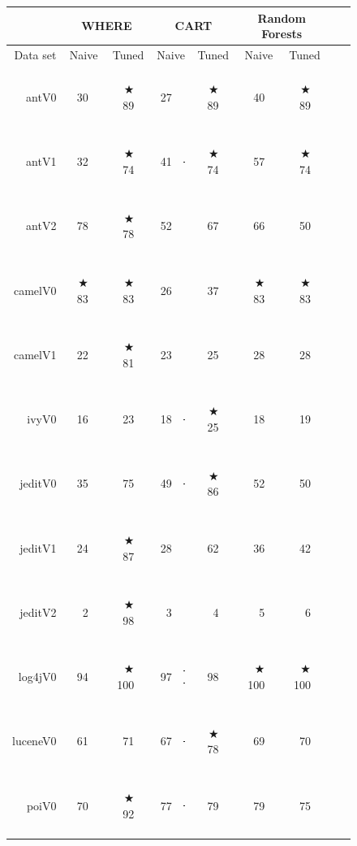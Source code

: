 \documentclass{sig-alternative}
\newcommand{\crule}[3][darkgray]{\textcolor{#1}{\rule{#2}{#3}}}
\newcommand{\rone}{\crule{1mm}{1.95mm}}
\newcommand{\rtwo}{\crule{1mm}{1.95mm}\hspace{0.3pt}\crule{1mm}{1.95mm}}
\newcommand{\rthree}{\crule{1mm}{1.95mm}\hspace{0.3pt}\crule{1mm}{1.95mm}\hspace{0.3pt}\crule{1mm}{1.95mm}}
\newcommand{\rfour}{\crule{1mm}{1.95mm}\hspace{0.3pt}\crule{1mm}{1.95mm}\hspace{0.3pt}\crule{1mm}{1.95mm}\hspace{0.3pt}\crule{1mm}{1.95mm}}
\def\baselinestretch{1}
\begin{document}
\begin{figure}
\renewcommand{\baselinestretch}{0.8} 

\scriptsize  
\begin{tabular}{r|r@{~}l@{~}|r@{~}l|r@{~}l|r@{~}l|r@{~}l@{~}|r@{~}l@{~}r@{~}l}
      &   \multicolumn{4}{c|}{WHERE}         &   \multicolumn{4}{c|}{CART}         &   \multicolumn{4}{c}{Random Forests}         \\\hline
  Data set   &   \multicolumn{2}{c}{Naive}         &   \multicolumn{2}{c|}{Tuned}         &   \multicolumn{2}{c}{Naive}         &   \multicolumn{2}{c|}{Tuned}    &   \multicolumn{2}{c}{Naive}  &   \multicolumn{2}{c}{Tuned}\\\hline
 
antV0 & 30 &         & $\bigstar$ 89 & {\rfour} & 27 &         &$\bigstar$ 89 & {\rfour} & 40 & {\rone} &$\bigstar$ 89 & {\rfour}\\
antV1 & 32 &         &$\bigstar$ 74 & {\rfour} & 41 & {\rone} &$\bigstar$ 74 & {\rfour} & 57 & {\rtwo} &$\bigstar$ 74 & {\rfour}\\
antV2 & 78 & {\rfour} &$\bigstar$ 78 & {\rfour} & 52 &         & 67 & {\rthree} & 66 & {\rtwo} & 50 &        \\
camelV0 &$\bigstar$ 83 & {\rfour} &$\bigstar$ 83 & {\rfour} & 26 &         & 37 &         &$\bigstar$ 83 & {\rfour} &$\bigstar$ 83 & {\rfour}\\
camelV1 & 22 &         &$\bigstar$ 81 & {\rfour} & 23 &         & 25 &         & 28 &         & 28 &        \\
ivyV0 & 16 &         & 23 & {\rthree} & 18 & {\rone} &$\bigstar$ 25 & {\rfour} & 18 & {\rone} & 19 & {\rone}\\
jeditV0 & 35 &         & 75 & {\rthree} & 49 & {\rone} &$\bigstar$ 86 & {\rfour} & 52 & {\rone} & 50 & {\rone}\\
jeditV1 & 24 &         &$\bigstar$ 87 & {\rfour} & 28 &         & 62 & {\rthree} & 36 &         & 42 & {\rone}\\
jeditV2 & 2 &         &$\bigstar$ 98 & {\rfour} & 3 &         & 4 &         & 5 &         & 6 &        \\
log4jV0 & 94 &         &$\bigstar$100 & {\rfour} & 97 & {\rtwo} & 98 & {\rthree} &$\bigstar$ 100 & {\rfour} &$\bigstar$100 & {\rfour}\\
luceneV0 & 61 &         & 71 & {\rtwo} & 67 & {\rone} &$\bigstar$ 78 & {\rfour} & 69 & {\rtwo} & 70 & {\rtwo}\\
poiV0 & 70 &         &$\bigstar$ 92 & {\rfour} & 77 & {\rone} & 79 & {\rtwo} & 79 & {\rtwo} & 75 & {\rone}\\

\end{tabular}
\end{figure}
\end{document}
